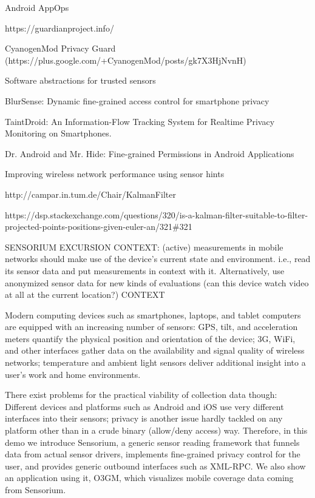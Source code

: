 Android AppOps

https://guardianproject.info/

CyanogenMod Privacy Guard (https://plus.google.com/+CyanogenMod/posts/gk7X3HjNvnH)

Software abstractions for trusted sensors \cite{Liu:2012:SAT:2307636.2307670}

BlurSense: Dynamic fine-grained access control for smartphone privacy~\cite{6798970}

TaintDroid: An Information-Flow Tracking System for Realtime Privacy Monitoring on Smartphones. \cite{enck2010taintdroid}

Dr. Android and Mr. Hide: Fine-grained Permissions in Android Applications \cite{Jeon:2012:DAM:2381934.2381938}

Improving wireless network performance using sensor hints \cite{ravindranath2011improving}

http://campar.in.tum.de/Chair/KalmanFilter

https://dsp.stackexchange.com/questions/320/is-a-kalman-filter-suitable-to-filter-projected-points-positions-given-euler-an/321\#321

SENSORIUM EXCURSION
CONTEXT: (active) measurements in mobile networks should make use of the device's current state and environment. i.e., read its sensor data and put measurements in context with it. Alternatively, use anonymized sensor data for new kinds of evaluations (can this device watch video at all at the current location?)
CONTEXT

Modern computing devices such as smartphones, laptops, and tablet computers are equipped with an increasing number of sensors: \gls{GPS}, tilt, and acceleration meters quantify the physical position and orientation of the device; 3G, WiFi, and other  interfaces gather data on the availability and signal quality of wireless networks; temperature and ambient light sensors deliver additional insight into a user's work and home environments.

There exist problems for the practical viability of collection data though: Different devices and platforms such as Android and iOS use very different interfaces into their sensors; privacy is another issue hardly tackled on any platform other than in a crude binary (allow/deny access) way. Therefore, in this demo we introduce Sensorium, a generic sensor reading framework that funnels data from actual sensor drivers, implements fine-grained privacy control for the user, and provides generic outbound interfaces such as \acrshort{XML}-\acrshort{RPC}. We also show an application using it, O3GM, which visualizes mobile coverage data coming from Sensorium.

